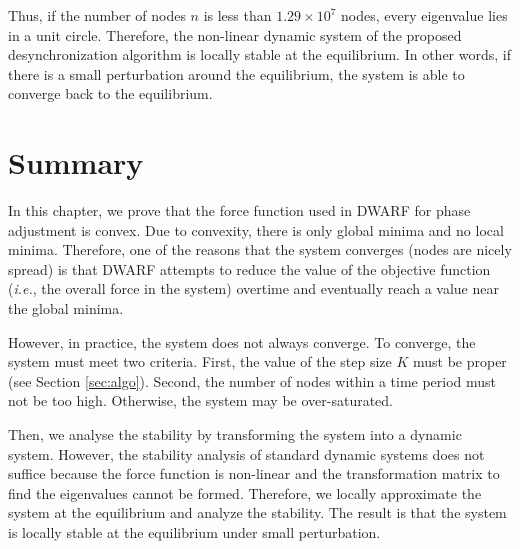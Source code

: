 
Thus, if the number of nodes $n$ is less than $1.29 \times 10^7$ nodes, every eigenvalue lies in a unit circle.
Therefore, the non-linear dynamic system of the proposed desynchronization algorithm is locally stable at the equilibrium.
In other words, if there is a small perturbation around the equilibrium, the system is able to converge back to the equilibrium.  

\section{Summary}
In this chapter, we prove that the force function used in DWARF for phase adjustment is convex. Due to convexity, there is only global minima and no local minima. Therefore, one of the reasons that the system converges (nodes are nicely spread) is that DWARF attempts to reduce the value of the objective function (\textit{i.e.}, the overall force in the system) overtime and eventually reach a value near the global minima.

However, in practice, the system does not always converge. To converge, the system must meet two criteria.
First, the value of the step size $K$ must be proper (see Section \ref{sec:algo}). Second, the number of nodes within a time period must not be too high. Otherwise, the system may be over-saturated.

Then, we analyse the stability by transforming the system into a dynamic system. However, the stability analysis of standard dynamic systems does not suffice because the force function is non-linear and the transformation matrix to find the eigenvalues cannot be formed. Therefore, we locally approximate the system at the equilibrium and analyze the stability. The result is that the system is locally stable at the equilibrium under small perturbation.
\clearpage
